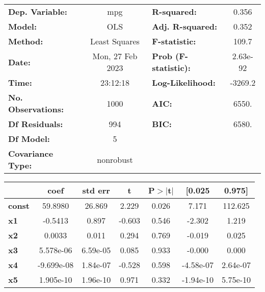 \begin{center}
\begin{tabular}{lclc}
\toprule
\textbf{Dep. Variable:}    &       mpg        & \textbf{  R-squared:         } &     0.356   \\
\textbf{Model:}            &       OLS        & \textbf{  Adj. R-squared:    } &     0.352   \\
\textbf{Method:}           &  Least Squares   & \textbf{  F-statistic:       } &     109.7   \\
\textbf{Date:}             & Mon, 27 Feb 2023 & \textbf{  Prob (F-statistic):} &  2.63e-92   \\
\textbf{Time:}             &     23:12:18     & \textbf{  Log-Likelihood:    } &   -3269.2   \\
\textbf{No. Observations:} &        1000      & \textbf{  AIC:               } &     6550.   \\
\textbf{Df Residuals:}     &         994      & \textbf{  BIC:               } &     6580.   \\
\textbf{Df Model:}         &           5      & \textbf{                     } &             \\
\textbf{Covariance Type:}  &    nonrobust     & \textbf{                     } &             \\
\bottomrule
\end{tabular}
\begin{tabular}{lcccccc}
               & \textbf{coef} & \textbf{std err} & \textbf{t} & \textbf{P$> |$t$|$} & \textbf{[0.025} & \textbf{0.975]}  \\
\midrule
\textbf{const} &      59.8980  &       26.869     &     2.229  &         0.026        &        7.171    &      112.625     \\
\textbf{x1}    &      -0.5413  &        0.897     &    -0.603  &         0.546        &       -2.302    &        1.219     \\
\textbf{x2}    &       0.0033  &        0.011     &     0.294  &         0.769        &       -0.019    &        0.025     \\
\textbf{x3}    &    5.578e-06  &     6.59e-05     &     0.085  &         0.933        &       -0.000    &        0.000     \\
\textbf{x4}    &   -9.699e-08  &     1.84e-07     &    -0.528  &         0.598        &    -4.58e-07    &     2.64e-07     \\
\textbf{x5}    &    1.905e-10  &     1.96e-10     &     0.971  &         0.332        &    -1.94e-10    &     5.75e-10     \\

\end{tabular}
\end{center}

